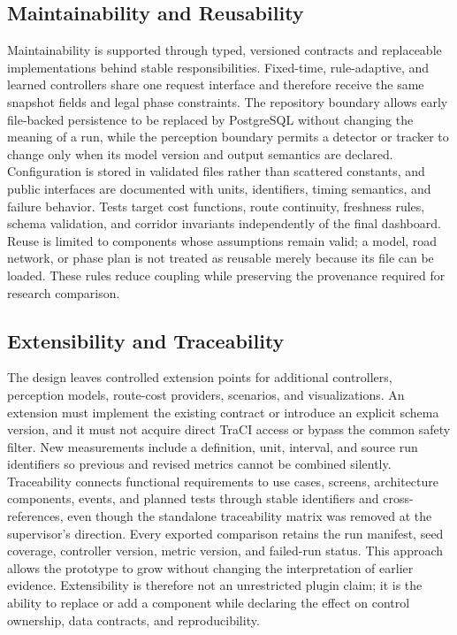 \subsection{Maintainability and Reusability}

Maintainability is supported through typed, versioned contracts and replaceable implementations behind stable responsibilities. Fixed-time, rule-adaptive, and learned controllers share one request interface and therefore receive the same snapshot fields and legal phase constraints. The repository boundary allows early file-backed persistence to be replaced by PostgreSQL without changing the meaning of a run, while the perception boundary permits a detector or tracker to change only when its model version and output semantics are declared. Configuration is stored in validated files rather than scattered constants, and public interfaces are documented with units, identifiers, timing semantics, and failure behavior. Tests target cost functions, route continuity, freshness rules, schema validation, and corridor invariants independently of the final dashboard. Reuse is limited to components whose assumptions remain valid; a model, road network, or phase plan is not treated as reusable merely because its file can be loaded. These rules reduce coupling while preserving the provenance required for research comparison.

\subsection{Extensibility and Traceability}

The design leaves controlled extension points for additional controllers, perception models, route-cost providers, scenarios, and visualizations. An extension must implement the existing contract or introduce an explicit schema version, and it must not acquire direct TraCI access or bypass the common safety filter. New measurements include a definition, unit, interval, and source run identifiers so previous and revised metrics cannot be combined silently. Traceability connects functional requirements to use cases, screens, architecture components, events, and planned tests through stable identifiers and cross-references, even though the standalone traceability matrix was removed at the supervisor's direction. Every exported comparison retains the run manifest, seed coverage, controller version, metric version, and failed-run status. This approach allows the prototype to grow without changing the interpretation of earlier evidence. Extensibility is therefore not an unrestricted plugin claim; it is the ability to replace or add a component while declaring the effect on control ownership, data contracts, and reproducibility.

